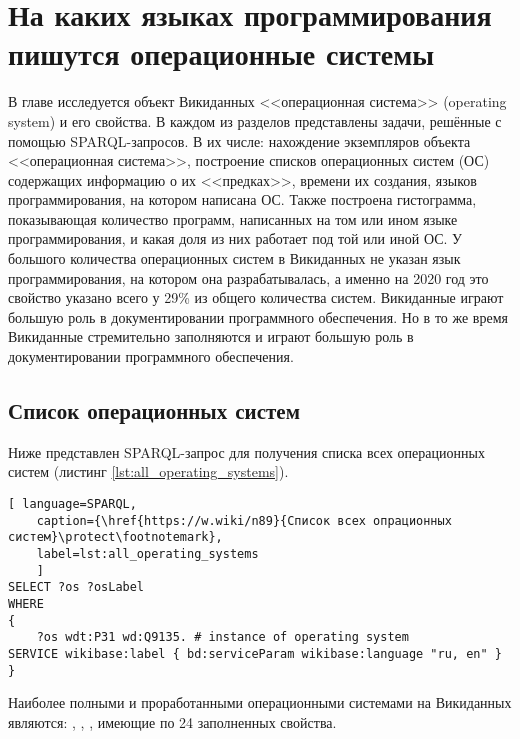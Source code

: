 \chapter{На каких языках программирования пишутся операционные системы}
\label{ch:operating-sysmets}

В главе исследуется объект Викиданных <<операционная система>> (operating system) и его свойства. В каждом из разделов представлены задачи, решённые с помощью SPARQL-запросов. В их числе: нахождение экземпляров объекта <<операционная система>>, построение списков операционных систем (ОС) содержащих информацию о их <<предках>>\footnotemark,
времени их создания, языков программирования, на котором написана ОС. Также построена гистограмма, показывающая количество программ, написанных на том или ином языке программирования, и какая доля из них работает под той или иной ОС. У большого количества операционных систем в Викиданных не указан язык программирования, на котором она разрабатывалась, а именно на 2020 год это свойство указано всего у 29\% из общего количества систем. Викиданные играют большую роль в документировании программного обеспечения. Но в то же время Викиданные стремительно заполняются и играют большую роль в документировании программного обеспечения.

\section{Список операционных систем}
Ниже представлен SPARQL-запрос для получения списка всех операционных систем (листинг \ref{lst:all_operating_systems}).

\begin{lstlisting}[ language=SPARQL, 
	caption={\href{https://w.wiki/n89}{Список всех опрационных систем}\protect\footnotemark},
	label=lst:all_operating_systems
	]
SELECT ?os ?osLabel
WHERE
{
	?os wdt:P31 wd:Q9135. # instance of operating system
SERVICE wikibase:label { bd:serviceParam wikibase:language "ru, en" }
}
\end{lstlisting}

Наиболее полными и проработанными операционными системами на Викиданных являются:  , , , имеющие по 24 заполненных свойства\cite{prowd_os_link}.

